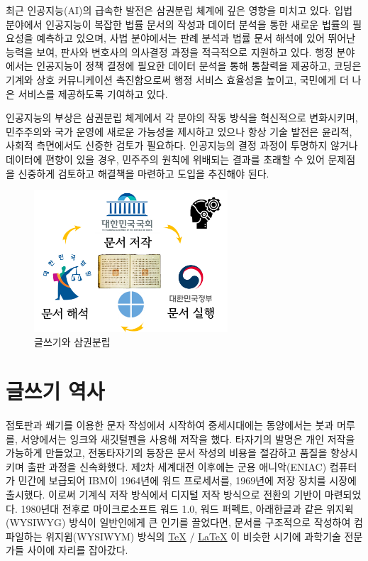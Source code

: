 \documentclass[
  letterpaper,
]{book}
\begin{document}
최근 인공지능(AI)의 급속한 발전은 삼권분립 체계에 깊은 영향을 미치고
있다. 입법 분야에서 인공지능이 복잡한 법률 문서의 작성과 데이터 분석을
통한 새로운 법률의 필요성을 예측하고 있으며, 사법 분야에서는 판례 분석과
법률 문서 해석에 있어 뛰어난 능력을 보여, 판사와 변호사의 의사결정
과정을 적극적으로 지원하고 있다. 행정 분야에서는 인공지능이 정책 결정에
필요한 데이터 분석을 통해 통찰력을 제공하고, 코딩은 기계와 상호
커뮤니케이션 촉진함으로써 행정 서비스 효율성을 높이고, 국민에게 더 나은
서비스를 제공하도록 기여하고 있다.

인공지능의 부상은 삼권분립 체계에서 각 분야의 작동 방식을 혁신적으로
변화시키며, 민주주의와 국가 운영에 새로운 가능성을 제시하고 있으나 항상
기술 발전은 윤리적, 사회적 측면에서도 신중한 검토가 필요하다. 인공지능의
결정 과정이 투명하지 않거나 데이터에 편향이 있을 경우, 민주주의 원칙에
위배되는 결과를 초래할 수 있어 문제점을 신중하게 검토하고 해결책을
마련하고 도입을 추진해야 된다.

\begin{figure}

{\centering \includegraphics[width=2.84375in,height=\textheight]{images/three-pillar.png}

}

\caption{글쓰기와 삼권분립}

\end{figure}

\hypertarget{uxae00uxc4f0uxae30-uxc5eduxc0ac}{%
\section{글쓰기 역사}\label{uxae00uxc4f0uxae30-uxc5eduxc0ac}}

점토판과 쐐기를 이용한 문자 작성에서 시작하여 중세시대에는 동양에서는
붓과 머루를, 서양에서는 잉크와 새깃털펜을 사용해 저작을 했다. 타자기의
발명은 개인 저작을 가능하게 만들었고, 전동타자기의 등장은 문서 작성의
비용을 절감하고 품질을 향상시키며 출판 과정을 신속화했다. 제2차 세계대전
이후에는 군용 애니악(ENIAC) 컴퓨터가 민간에 보급되어 IBM이 1964년에 워드
프로세서를, 1969년에 저장 장치를 시장에 출시했다. 이로써 기계식 저작
방식에서 디지털 저작 방식으로 전환의 기반이 마련되었다. 1980년대 전후로
마이크로소프트 워드 1.0, 워드 퍼펙트, 아래한글과 같은 위지윅(WYSIWYG)
방식이 일반인에게 큰 인기를 끌었다면, 문서를 구조적으로 작성하여
컴파일하는 위지윔(WYSIWYM) 방식의 \href{http://example.org}{\TeX} /
\href{http://example.org}{\LaTeX} 이 비슷한 시기에 과학기술 전문가들
사이에 자리를 잡아갔다.
\end{document}
